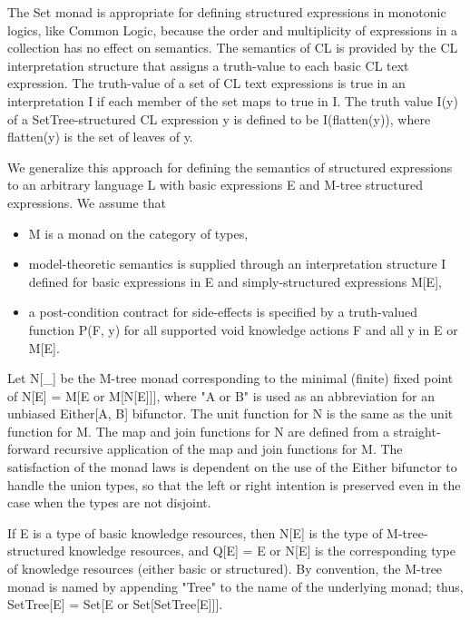 \documentclass[runningheads]{llncs}
\begin{document}
The Set monad is appropriate for defining structured expressions in monotonic logics, like Common Logic, because the order and multiplicity of expressions in a collection has no effect on semantics. The semantics of CL is provided by the CL interpretation structure that assigns a truth-value to each basic CL text expression. The truth-value of a set of CL text expressions is true in an interpretation I if each member of the set maps to true in I. The truth value I(y) of a SetTree-structured CL expression y is defined to be I(flatten(y)), where flatten(y) is the set of leaves of y.

We generalize this approach for defining the semantics of structured expressions to an arbitrary language L with basic expressions E and M-tree structured expressions. We assume that 
\begin{itemize}
\item M is a monad on the category of types,
\item model-theoretic semantics is supplied through an interpretation structure I defined for basic expressions in E and simply-structured expressions M[E],
\item a post-condition contract for side-effects is specified by a truth-valued function P(F, y) for all supported void knowledge actions F and all y in E or M[E].
\end{itemize}

Let N[\_] be the M-tree monad corresponding to the minimal (finite) fixed point of N[E] = M[E or M[N[E]]], where "A or B" is used as an abbreviation for an unbiased Either[A, B] bifunctor.
The unit function for N is the same as the unit function for M.
The map and join functions for N are defined from a straight-forward recursive application of the map and join functions for M.
The satisfaction of the monad laws is dependent on the use of the Either bifunctor to handle the union types, so that the left or right intention is preserved even in the case when the types are not disjoint. 

If E is a type of basic knowledge resources, then N[E] is the type of M-tree-structured knowledge resources, and
Q[E] = E or N[E] is the corresponding type of knowledge resources (either basic or structured). By convention, the M-tree monad is named by appending "Tree" to the name of the underlying monad; thus, SetTree[E] = Set[E or Set[SetTree[E]]].
\end{document}
